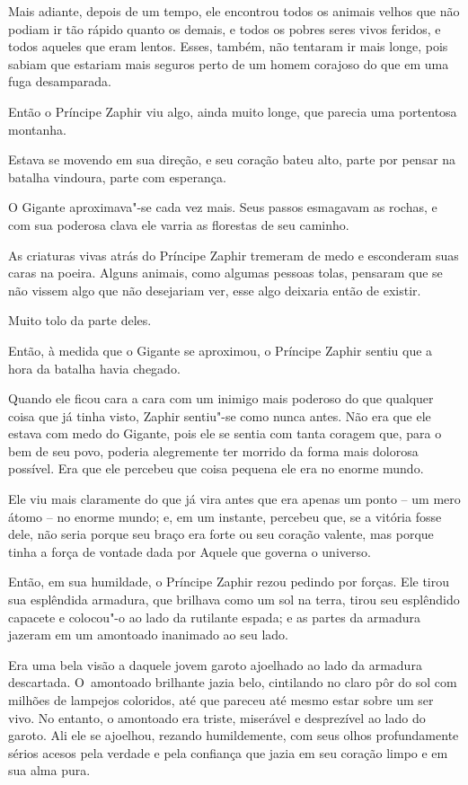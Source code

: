 Mais adiante, depois de um tempo, ele encontrou todos os animais velhos
que não podiam ir tão rápido quanto os demais, e todos os pobres seres
vivos feridos, e todos aqueles que eram lentos. Esses, também, não
tentaram ir mais longe, pois sabiam que estariam mais seguros perto de
um homem corajoso do que em uma fuga desamparada.

Então o Príncipe Zaphir viu algo, ainda muito longe, que parecia uma
portentosa montanha.

Estava se movendo em sua direção, e seu coração bateu alto, parte por
pensar na batalha vindoura, parte com esperança.

O Gigante aproximava"-se cada vez mais. Seus passos esmagavam as rochas,
e com sua poderosa clava ele varria as florestas de seu caminho.

As criaturas vivas atrás do Príncipe Zaphir tremeram de medo e
esconderam suas caras na poeira. Alguns animais, como algumas pessoas
tolas, pensaram que se não vissem algo que não desejariam ver, esse algo
deixaria então de existir.

Muito tolo da parte deles.

Então, à medida que o Gigante se aproximou, o Príncipe Zaphir sentiu que
a hora da batalha havia chegado.



Quando ele ficou cara a cara com um inimigo mais poderoso do que
qualquer coisa que já tinha visto, Zaphir sentiu"-se como nunca antes.
Não era que ele estava com medo do Gigante, pois ele se sentia com tanta
coragem que, para o bem de seu povo, poderia alegremente ter morrido da
forma mais dolorosa possível. Era que ele percebeu que coisa pequena ele
era no enorme mundo.

Ele viu mais claramente do que já vira antes que era apenas um ponto --
um mero átomo -- no enorme mundo; e, em um instante, percebeu que, se a
vitória fosse dele, não seria porque seu braço era forte ou seu coração
valente, mas porque tinha a força de vontade dada por Aquele que governa
o universo.

Então, em sua humildade, o Príncipe Zaphir rezou pedindo por forças. Ele
tirou sua esplêndida armadura, que brilhava como um sol na terra, tirou
seu esplêndido capacete e colocou"-o ao lado da rutilante espada; e as
partes da armadura jazeram em um amontoado inanimado ao seu lado.

Era uma bela visão a daquele jovem garoto ajoelhado ao lado da armadura
descartada. O~amontoado brilhante jazia belo, cintilando no claro pôr do
sol com milhões de lampejos coloridos, até que pareceu até mesmo estar
sobre um ser vivo. No entanto, o amontoado era triste, miserável e
desprezível ao lado do garoto. Ali ele se ajoelhou, rezando
humildemente, com seus olhos profundamente sérios acesos pela verdade e
pela confiança que jazia em seu coração limpo e em sua alma pura.

